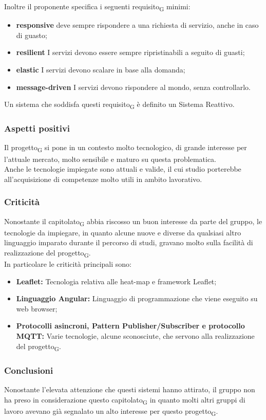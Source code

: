 Inoltre il proponente specifica i seguenti requisito\textsubscript{G} minimi:
\begin{itemize}
	\item \textbf{responsive} deve sempre rispondere a una richiesta di servizio, anche in caso di guasto;
	\item \textbf{resilient} I servizi devono essere sempre ripristinabili a seguito di guasti;
	\item \textbf{elastic} I servizi devono scalare in base alla domanda;
	\item \textbf{message-driven} I servizi devono rispondere al mondo, senza controllarlo.
\end{itemize}
Un sistema che soddisfa questi requisito\textsubscript{G} è definito un Sistema Reattivo.


\subsubsection{Aspetti positivi}

Il progetto\textsubscript{G} si pone in un contesto molto tecnologico, di grande interesse per l'attuale mercato, molto sensibile e maturo su questa problematica.\\
Anche le tecnologie impiegate sono attuali e valide, il cui studio porterebbe all'acquisizione di competenze molto utili in ambito lavorativo.



\subsubsection{Criticità}

Nonostante il capitolato\textsubscript{G} abbia riscosso un buon interesse da parte del gruppo, le tecnologie da impiegare, in quanto alcune nuove e diverse da qualsiasi altro linguaggio imparato durante il percorso di studi, gravano molto sulla facilità di realizzazione del progetto\textsubscript{G}.\\
In particolare le criticità principali sono:
\begin{itemize}
    \item \textbf{Leaflet:} Tecnologia relativa alle heat-map e framework Leaflet;
    \item \textbf{Linguaggio Angular:} Linguaggio di programmazione che viene eseguito su web browser;
    \item \textbf{Protocolli asincroni, Pattern Publisher/Subscriber e protocollo MQTT: } Varie tecnologie, alcune sconosciute, che servono alla realizzazione del progetto\textsubscript{G}.
\end{itemize}


\subsubsection{Conclusioni}

Nonostante l'elevata attenzione che questi sistemi hanno attirato, il gruppo non ha preso in considerazione questo capitolato\textsubscript{G} in quanto molti altri gruppi di lavoro avevano già segnalato un alto interesse per questo progetto\textsubscript{G}. \\
